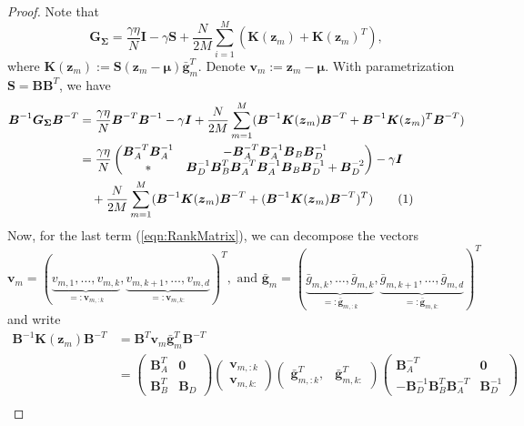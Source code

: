 \documentclass[a4paper, 11pt, oneside]{scrartcl}
\theoremstyle{break}
\newcommand{\matr}[1]{\boldsymbol{#1}}
\newcommand{\numberthis}{\addtocounter{equation}{1}\tag{\theequation}}
\numberwithin{equation}{section}
\begin{document}
					\begin{proof}
						Note that 
						$$\matr{G_{\Sigma}} = \frac{\gamma \eta}{N} \matr{I} - \gamma \matr{S} + \frac{N}{2 M} \sum_{i=1}^M (\matr{K}(\matr{z}_m) + \matr{K}(\matr{z}_m)^T),$$
						where $\matr{K}(\matr{z}_m) := \matr{S} (\matr{z}_m - \matr{\mu}) \matr{\bar{g}}_m^T$.
						Denote $\matr{v}_m := \matr{z}_m - \matr{\mu}$.
						With parametrization $\matr{S} = \matr{B} \matr{B}^T$, we have
						\begin{align*}
							\matr{B}^{-1} \matr{G_{\Sigma}} \matr{B}^{-T} &= \frac{\gamma \eta}{N} \matr{B}^{-T} \matr{B}^{-1} - \gamma \matr{I} + \frac{N}{2 M} \sum_{m=1}^M (\matr{B}^{-1} \matr{K}(\matr{z}_m) \matr{B}^{-T} + \matr{B}^{-1} \matr{K}(\matr{z}_m)^T \matr{B}^{-T}) \\
							&= \frac{\gamma \eta}{N} \begin{pmatrix} \matr{B}_A^{-T} \matr{B}_A^{-1} & -\matr{B}_A^{-T} \matr{B}_A^{-1} \matr{B}_B \matr{B}_D^{-1} \\ * & \matr{B}_D^{-1} \matr{B}_B^T \matr{B}_A^{-T} \matr{B}_A^{-1} \matr{B}_B \matr{B}_D^{-1} + \matr{B}_D^{-2} \end{pmatrix} - \gamma \matr{I} \\
							&\quad + \frac{N}{2 M} \sum_{m=1}^M (\matr{B}^{-1} \matr{K}(\matr{z}_m) \matr{B}^{-T} + (\matr{B}^{-1} \matr{K}(\matr{z}_m) \matr{B}^{-T})^T) \numberthis{\label{eqn:RankMatrix}}
						\end{align*}
						Now, for the last term (\ref{eqn:RankMatrix}), we can decompose the vectors 
						$$\matr{v}_m = (\underbrace{v_{m, 1}, \dots, v_{m, k}}_{=: \matr{v}_{m, :k}}, \underbrace{v_{m, k+1}, \dots, v_{m, d}}_{=:\matr{v}_{m, k:}})^T, \text{ and } \matr{\bar{g}}_{m} = (\underbrace{\bar{g}_{m, k}, \dots, \bar{g}_{m, k}}_{=: \matr{\bar{g}}_{m, :k}}, \underbrace{\bar{g}_{m, k+1}, \dots, \bar{g}_{m, d}}_{=:\matr{\bar{g}}_{m, k:}})^T$$
						and write
						\begin{align*}
							\matr{B}^{-1} \matr{K}(\matr{z}_m) \matr{B}^{-T} &= \matr{B}^T \matr{v}_m \matr{\bar{g}}_m^T \matr{B}^{-T} \\
							&= \begin{pmatrix} \matr{B}_A^T & \matr{0} \\ \matr{B}_B^T & \matr{B}_D \end{pmatrix} \begin{pmatrix} \matr{v}_{m, :k} \\ \matr{v}_{m, k:} \end{pmatrix} \begin{pmatrix} \matr{\bar{g}}_{m, :k}^T, & \matr{\bar{g}}_{m, k:}^T \end{pmatrix} \begin{pmatrix} \matr{B}_A^{-T} & \matr{0} \\ -\matr{B}_D^{-1} \matr{B}_B^T \matr{B}_A^{-T} & \matr{B}_D^{-1} \end{pmatrix} \\

\end{align*}
\end{proof}
\end{document}
